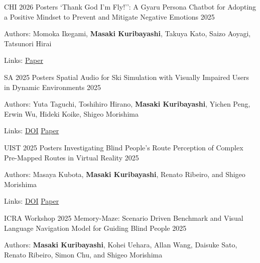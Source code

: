 
\begin{cventries}

  \cventry
    {CHI 2026 Posters}
    {`Thank God I’m Fly!'': A Gyaru Persona Chatbot for Adopting a Positive Mindset to Prevent and Mitigate Negative Emotions}
    {}
    {2025}
    {
      \begin{cvitems}
        \item {Authors: Momoka Ikegami, \textbf{Masaki Kuribayashi}, Takuya Kato, Saizo Aoyagi, Tatsunori Hirai}
        \item {Links: \href{https://www.masakikuribayashi.com/data/project/ikegami_momoka_chi_2026}{Paper}}
      \end{cvitems}
    }

  \cventry
    {SA 2025 Posters}
    {Spatial Audio for Ski Simulation with Visually Impaired Users in Dynamic Environments}
    {}
    {2025}
    {
      \begin{cvitems}
        \item {Authors: Yuta Taguchi, Toshihiro Hirano, \textbf{Masaki Kuribayashi}, Yichen Peng, Erwin Wu, Hideki Koike, Shigeo Morishima}
        \item {Links: \href{https://doi.org/10.1145/3757374.3771466}{DOI} \enskip\textbar\enskip \href{https://www.masakikuribayashi.com/data/project/yuta_taguchi_sa_2025/paper.pdf}{Paper}}
      \end{cvitems}
    }

  \cventry
    {UIST 2025 Posters}
    {Investigating Blind People's Route Perception of Complex Pre-Mapped Routes in Virtual Reality}
    {}
    {2025}
    {
      \begin{cvitems}
        \item {Authors: Masaya Kubota, \textbf{Masaki Kuribayashi}, Renato Ribeiro, and Shigeo Morishima}
        \item {Links: \href{https://doi.org/10.1145/3746058.3758403}{DOI} \enskip\textbar\enskip \href{https://www.masakikuribayashi.com/data/project/masaya_kubota_uist_2025/paper.pdf}{Paper}}
      \end{cvitems}
    }

  \cventry
    {ICRA Workshop 2025}
    {Memory-Maze: Scenario Driven Benchmark and Visual Language Navigation Model for Guiding Blind People}
    {}
    {2025}
    {
      \begin{cvitems}
        \item {Authors: \textbf{Masaki Kuribayashi}, Kohei Uehara, Allan Wang, Daisuke Sato, Renato Ribeiro, Simon Chu, and Shigeo Morishima}
      \end{cvitems}
    }


\end{cventries}
